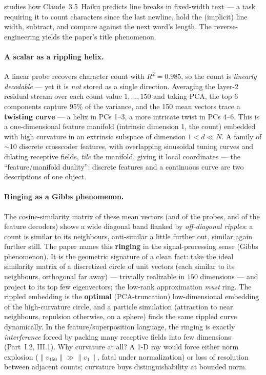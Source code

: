 \textcite{when-models-manipulate-manifolds-counting} studies how Claude~3.5~Haiku predicts line breaks in fixed-width text --- a task requiring it to count characters since the last newline, hold the (implicit) line width, subtract, and compare against the next word's length. The reverse-engineering yields the paper's title phenomenon.

\paragraph*{A scalar as a rippling helix.}
A linear probe recovers character count with $R^{2}=0.985$, so the count is \emph{linearly decodable} --- yet it is \emph{not} stored as a single direction. Averaging the layer-2 residual stream over each count value $1,\dots,150$ and taking PCA, the top 6 components capture 95\% of the variance, and the 150 mean vectors trace a \textbf{twisting curve} --- a helix in PCs 1--3, a more intricate twist in PCs 4--6. This is a one-dimensional feature manifold (intrinsic dimension 1, the count) embedded with high curvature in an extrinsic subspace of dimension $1<d\ll N$. A family of $\sim$10 discrete crosscoder features, with overlapping sinusoidal tuning curves and dilating receptive fields, \emph{tile} the manifold, giving it local coordinates --- the ``feature/manifold duality'': discrete features and a continuous curve are two descriptions of one object.

\paragraph*{Ringing as a Gibbs phenomenon.}
The cosine-similarity matrix of these mean vectors (and of the probes, and of the feature decoders) shows a wide diagonal band flanked by \emph{off-diagonal ripples}: a count is similar to its neighbours, anti-similar a little further out, similar again further still. The paper names this \textbf{ringing} in the signal-processing sense (Gibbs phenomenon). It is the geometric signature of a clean fact: take the ideal similarity matrix of a discretized circle of unit vectors (each similar to its neighbours, orthogonal far away) --- trivially realizable in $150$ dimensions --- and project to its top few eigenvectors; the low-rank approximation \emph{must} ring. The rippled embedding is the \textbf{optimal} (PCA-truncation) low-dimensional embedding of the high-curvature circle, and a particle simulation (attraction to near neighbours, repulsion otherwise, on a sphere) finds the same rippled curve dynamically. In the feature/superposition language, the ringing is exactly \emph{interference} forced by packing many receptive fields into few dimensions (Part~I.2, III.1). Why curvature at all? A 1-D ray would force either norm explosion ($\|v_{150}\|\gg\|v_1\|$, fatal under normalization) or loss of resolution between adjacent counts; curvature buys distinguishability at bounded norm.

